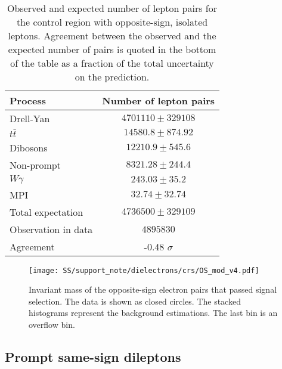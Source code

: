 \begin{table}[htbp]
\begin{center}
\begin{tabular}{l|c}

Process & Number of lepton pairs \\\hline\hline
        Drell-Yan	& $ 4701110 \pm 329108 $	\\[+0.05in]
	$t\bar{t}$	& $ 14580.8 \pm 874.92 $	\\[+0.05in]
	Dibosons	& $ 12210.9 \pm 545.6 $	\\[+0.05in]
	Non-prompt	& $ 8321.28 \pm 244.4 $	\\[+0.05in]
	$W\gamma$	& $ 243.03 \pm 35.2 $	\\[+0.05in]
	MPI	& $ 32.74 \pm 32.74 $	\\[+0.05in]
	\hline
	Total expectation	& $ 4736500 \pm 329109 $	\\[+0.05in]
	\hline
	Observation in data	& $ 4895830 $	\\[+0.05in]
	\hline
	Agreement & -0.48 $\sigma$ \\[+0.05in]
\hline  
\end{tabular}
\end{center}
\caption{Observed and expected number of lepton pairs for the control region with opposite-sign, isolated leptons.
Agreement between the observed and the expected number of pairs is quoted in the bottom of the table as a fraction of the total uncertainty on the prediction.
} %
\label{tab:dilep_isoOS}
\end{table}

\begin{figure}[h]
\begin{center}
\texttt{[image: SS/support\_note/dielectrons/crs/OS\_mod\_v4.pdf]}
\caption{Invariant mass of the opposite-sign electron pairs that passed signal selection.
The data is shown as closed circles. The stacked histograms represent the background estimations. 
The last bin is an overflow bin.
}
\label{fig:OS_CR}
\end{center}
\end{figure} 

\subsection{Prompt same-sign dileptons}


